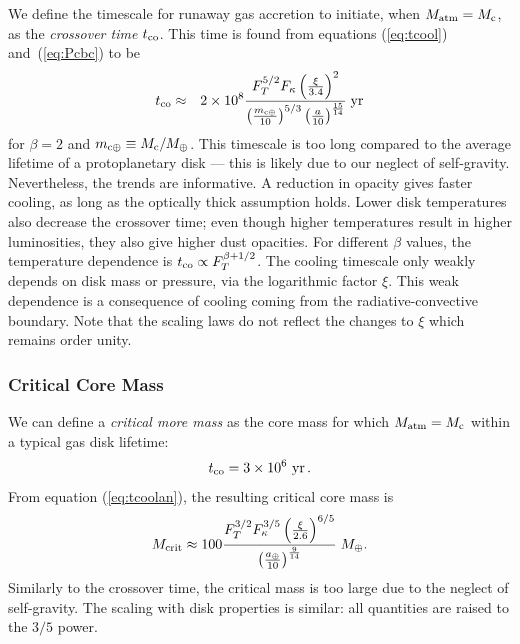 \documentclass[apj]{emulateapj}
\newcommand{\yr}{\; {\rm yr}}
\newcommand{\Eqs}[2]{equations (\ref{#1}) and~(\ref{#2})}
\newcommand{\mc}{m_{\rm c \oplus}}
\newcommand{\au}{a_\oplus}
\begin{document}
We define the timescale for runaway gas accretion to initiate, when $M_{\rm{atm}}=M_{\rm c}$, as the \textit{crossover time} $t_{\rm{co}}$. This time is found from \Eqs{eq:tcool}{eq:Pcbc} to be
\begin{eqnarray} 
\label{eq:tcoolan}
t_{\rm co} &\approx & 2 \times 10^8 {F_T^{5/2}  F_\kappa \left(\xi \over 3.4\right)^2  \over \left(\mc \over 10 \right)^{5/3} \left(a\over 10\right)^{15 \over 14}} \yr
\end{eqnarray} 
for $\beta = 2$ and $\mc \equiv M_{\rm c} / M_{\oplus}$.  
This timescale is too long compared to the average lifetime of a protoplanetary disk --- this is likely due to our neglect of self-gravity.  Nevertheless, the trends are informative.   A reduction in opacity gives faster cooling, as long as the optically thick assumption holds.  Lower disk temperatures also decrease the crossover time;  even though higher temperatures result in higher luminosities, they also give higher dust opacities.   For different $\beta$ values, the temperature dependence is $t_{\rm co} \propto F_T^{ \beta + 1/2}$.  The cooling timescale only weakly depends on disk mass or pressure, via the  logarithmic factor $\xi$.  This weak dependence is a consequence of cooling coming from the radiative-convective boundary.  Note that the scaling laws do not reflect the changes to $\xi$ which remains order unity. %



\subsubsection{Critical Core Mass}\label{sec:critmass}


We can define a \textit{critical more mass} as the core mass for which $M_{\rm{atm}}=M_{\rm c}$ within a typical gas disk lifetime:
\begin{equation}
t_{\rm co} = 3 \times 10^6 ~{\rm yr} \,.
\end{equation} 
From equation (\ref{eq:tcoolan}), the resulting critical core mass is
\begin{equation}\label{eq:Mcrit}
M_{\rm crit} \approx 100 {F_T^{3/2} F_\kappa^{3/5}   \left(\xi \over 2.6 \right)^{6/5} \over \left(\au \over 10\right)^{9 \over 14}} \; M_\oplus.
\end{equation} 
Similarly to the crossover time, the critical mass is too large due to the neglect of self-gravity.  The scaling with disk properties is similar: all quantities are raised to the $3/5$ power.  
\end{document}
